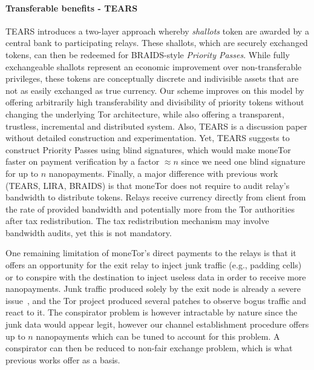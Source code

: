 \paragraph*{Transferable benefits - TEARS} TEARS introduces a two-layer approach whereby \emph{shallots}
token are awarded by a central bank to participating relays. These shallots,
which are securely exchanged tokens, can then be redeemed for BRAIDS-style
\emph{Priority Passes}. While fully exchangeable shallots represent an economic
improvement over non-transferable privileges, these tokens are conceptually
discrete and indivisible assets that are not as easily exchanged as true
currency. Our scheme improves on this model by offering arbitrarily high
transferability and divisibility of priority tokens without changing the
underlying Tor architecture, while also offering a transparent, trustless, incremental and distributed system. Also, TEARS is a discussion paper without detailed construction and experimentation. Yet, TEARS suggests to construct Priority Passes using blind signatures, which would make moneTor faster on payment verification by a factor $\approx n$  since we need one blind signature for up to $n$ nanopayments. Finally, a major difference with previous work (TEARS, LIRA, BRAIDS) is that moneTor does not require to audit relay's bandwidth to distribute tokens. Relays receive currency directly from client from the rate of provided bandwidth and potentially more from the Tor authorities after tax redistribution. The tax redistribution mechanism may involve bandwidth audits, yet this is not mandatory.

One remaining limitation of moneTor's direct payments to the relays is
that it offers an opportunity for the exit relay to inject junk
traffic (e.g., padding cells) or to conspire with the destination to
inject useless data in order to receive more nanopayments. Junk
traffic produced solely by the exit node is already a severe
issue~\cite{rochet2018dropping}, and the Tor project produced several
patches to observe bogus traffic and react to it. The conspirator
problem is however intractable by nature since the junk data would
appear legit, however our channel establishment procedure offers up to
$n$ nanopayments which can be tuned to account for this problem.  A
conspirator can then be reduced to non-fair exchange problem, which is
what previous works offer as a basis.




